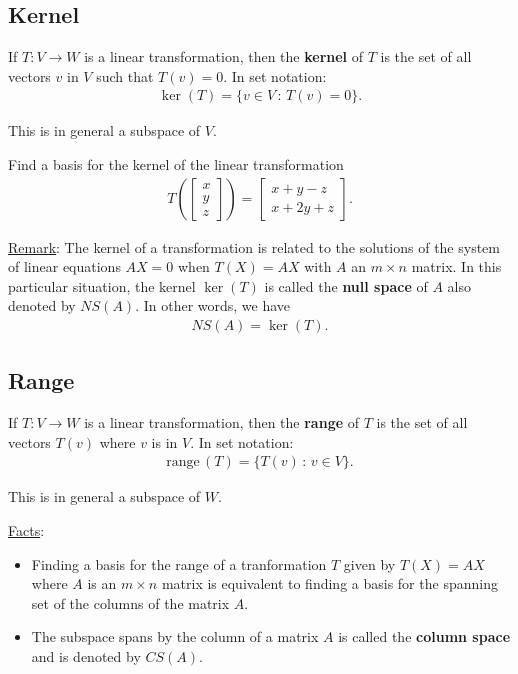 \documentclass[12pt,a4paper]{article}
\newcommand{\range}{\mathrm{range}\,}
\newcounter{example}[section]
\begin{document}
	\subsection{Kernel}
	If $T : V \rightarrow W$ is a linear transformation, then the \textbf{kernel} of $T$ is the set of all vectors $v$ in $V$ such that $T(v) = 0$. In set notation:
		\begin{align*}
		\ker (T) = \{ v \in V \, : \, T(v) = 0 \} .
		\end{align*}
		
	This is in general a subspace of $V$.
		
	\begin{example}\label{Ex:kernelBasis}
	Find a basis for the kernel of the linear transformation
		\begin{align*}
		T \left( \begin{bmatrix}
		x \\ y \\ z
		\end{bmatrix} \right) = \begin{bmatrix}
		x + y - z \\ x + 2y + z
		\end{bmatrix} .
		\end{align*}
	\end{example}
	
	\vfill
	
	\underline{Remark}: The kernel of a transformation is related to the solutions of the system of linear equations $AX = 0$ when $T (X) = AX$ with $A$ an $m \times n$ matrix. In this particular situation, the kernel $\ker (T)$ is called the \textbf{null space} of $A$ also denoted by $NS (A)$. In other words, we have
		\begin{align*}
		NS (A) = \ker (T) .
		\end{align*}
		
	\newpage
	
	\subsection{Range}
	If $T : V \rightarrow W$ is a linear transformation, then the \textbf{range} of $T$ is the set of all vectors $T(v)$ where $v$ is in $V$. In set notation:
		\begin{align*}
		\range (T) = \{  T(v) \, : \, v \in V \} .
		\end{align*}
	
	This is in general a subspace of $W$.
	
	\underline{Facts}: 
		\begin{itemize}
		\item Finding a basis for the range of a tranformation $T$ given by $T(X) = AX$ where $A$ is an $m \times n$ matrix is equivalent to finding a basis for the spanning set of the columns of the matrix $A$.
		\item The subspace spans by the column of a matrix $A$ is called the \textbf{column space} and is denoted by $CS (A)$.
		\end{itemize}
		
\end{document}
